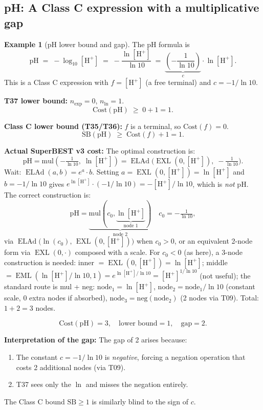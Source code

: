 \documentclass[12pt,a4paper]{article}
\theoremstyle{definition}
\newtheorem{example}[theorem]{Example}
\newcommand{\EML}{\operatorname{EML}}
\newcommand{\EXL}{\operatorname{EXL}}
\newcommand{\ELAd}{\operatorname{ELAd}}
\newcommand{\Cost}{\mathrm{Cost}}
\newcommand{\SB}{\mathrm{SB}}
\begin{document}
\subsection{pH: A Class C expression with a multiplicative gap}

\begin{example}[pH lower bound and gap]\label{ex:pH}
The pH formula is
\[
  \mathrm{pH} \;=\; -\log_{10}[\mathrm{H}^+] \;=\; -\frac{\ln[\mathrm{H}^+]}{\ln 10}
  \;=\; \underbrace{\left(-\frac{1}{\ln 10}\right)}_{c}\cdot\ln[\mathrm{H}^+].
\]
This is a Class C expression with $f = [\mathrm{H}^+]$ (a free terminal) and
$c = -1/\ln 10$.

\medskip
\noindent\textbf{T37 lower bound:}
$n_{\exp} = 0$, $n_{\ln} = 1$.
\[
  \Cost(\mathrm{pH}) \;\geq\; 0 + 1 = 1.
\]

\medskip
\noindent\textbf{Class C lower bound (T35/T36):}
$f$ is a terminal, so $\Cost(f) = 0$.
\[
  \SB(\mathrm{pH}) \;\geq\; \Cost(f) + 1 = 1.
\]

\medskip
\noindent\textbf{Actual SuperBEST v3 cost:}
The optimal construction is:
\[
  \mathrm{pH} = \mathrm{mul}\!\left(-\tfrac{1}{\ln 10},\;\ln[\mathrm{H}^+]\right)
  = \ELAd\!\bigl(\EXL(0,[\mathrm{H}^+]),\;-\tfrac{1}{\ln 10}\bigr).
\]
Wait: $\ELAd(a,b)=e^a\cdot b$.  Setting $a=\EXL(0,[\mathrm{H}^+])=\ln[\mathrm{H}^+]$
and $b=-1/\ln 10$ gives $e^{\ln[\mathrm{H}^+]}\cdot(-1/\ln 10) = -[\mathrm{H}^+]/\ln 10$,
which is \emph{not} pH.  The correct construction is:
\[
  \mathrm{pH} = \underbrace{\mathrm{mul}(c_0,\underbrace{\ln[\mathrm{H}^+]}_{\text{node 1}})}_{\text{node 2}}
  \quad c_0 = -\tfrac{1}{\ln 10},
\]
via $\ELAd\!\bigl(\ln(c_0),\,\EXL(0,[\mathrm{H}^+])\bigr)$ when $c_0>0$,
or an equivalent 2-node form via $\EXL(0,\cdot)$ composed with a scale.
For $c_0 < 0$ (as here), a 3-node construction is needed:
inner $= \EXL(0,[\mathrm{H}^+]) = \ln[\mathrm{H}^+]$;
middle $= \EML(\ln[\mathrm{H}^+] / \ln 10, 1) = e^{\ln[\mathrm{H}^+]/\ln 10} = [\mathrm{H}^+]^{1/\ln 10}$ (not useful);
the standard route is mul + neg:
$\mathrm{node}_1 = \ln[\mathrm{H}^+]$,
$\mathrm{node}_2 = \mathrm{node}_1 / \ln 10$ (constant scale, 0 extra nodes if absorbed),
$\mathrm{node}_3 = \mathrm{neg}(\mathrm{node}_2)$ (2 nodes via T09).
Total: $1 + 2 = 3$ nodes.

\medskip
\[
  \boxed{\Cost(\mathrm{pH}) = 3,\quad \text{lower bound} = 1,\quad \text{gap} = 2.}
\]

\medskip
\noindent\textbf{Interpretation of the gap:}
The gap of 2 arises because:
\begin{enumerate}
  \item The constant $c = -1/\ln 10$ is \emph{negative}, forcing a negation
        operation that costs 2 additional nodes (via T09).
  \item T37 sees only the $\ln$ and misses the negation entirely.
\end{enumerate}
The Class C bound $\SB \geq 1$ is similarly blind to the sign of $c$.
\end{example}
\end{document}

